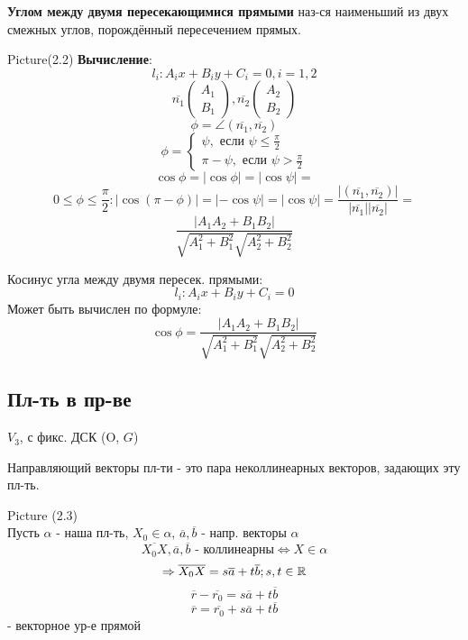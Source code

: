 \begin{definition}
\textbf{Углом между двумя пересекающимися прямыми} наз-ся наименьший из двух смежных углов, порождённый пересечением прямых.
\end{definition}
Picture(2.2)
\textbf{Вычисление}:
\[
l_i \colon A_ix + B_i y + C_i = 0, i = 1, 2
\]
\[
\overline{n_1} \begin{pmatrix}A_1 \\ B_1 \end{pmatrix}, \overline{n_2} \begin{pmatrix}A_2 \\ B_2 \end{pmatrix}
\]
\[
\phi = \angle(\overline{n_1}, \overline{n_2})
\]
\begin{equation*}
\phi = \begin{cases}
\psi, \text{ если } \psi \leq \frac{\pi}{2} \\
\pi - \psi, \text{ если } \psi > \frac{\pi}{2}
\end{cases}
\end{equation*}
\[
\cos \phi = \left|\cos\phi\right| = \left|\cos\psi\right| = 
\]
\begin{equation*}
0 \leq \phi \leq \frac{\pi}{2} \colon \left|\cos (\pi - \phi)\right| = \left|-\cos \psi\right| = \left|\cos \psi\right| = \frac{\left|(\overline{n_1}, \overline{n_2})\right|}{\left|\overline{n_1}\right|\left|\overline{n_2}\right|} =
\end{equation*}
\[
  \frac{\left|A_1A_2 + B_1B_2\right|}{\sqrt{A_1^{2} + B_1^{2}}\sqrt{A_2^{2} + B_2^{2}}}
\]

\begin{statement}
Косинус угла между двумя пересек. прямыми:
\[
l_i \colon A_i x + B_i y + C_i = 0
\]
Может быть вычислен по формуле:
\[
\cos\phi = \frac{\left|A_1A_2 + B_1B_2\right|}{\sqrt{A_1^{2} + B_1^{2}}\sqrt{A_2^{2} + B_2^{2}}}
\]
\end{statement}
\subsection{Пл-ть в пр-ве}
$V_3$, с фикс. ДСК (O, $G$)
\begin{definition}
Направляющий векторы пл-ти - это пара неколлинеарных векторов, задающих эту пл-ть.
\end{definition}
Picture (2.3) \\

Пусть $\alpha$ - наша пл-ть, $X_0 \in \alpha$, $\overline{a}, \overline{b}$ - напр. векторы $\alpha$ \\
\[
\overline{X_0X}, \overline{a}, \overline{b} \text{ - коллинеарны} \iff X \in \alpha
\]
\[
\Rightarrow \overline{X_0X} = s \overline{a} + t \overline{b}; s, t \in \mathbb{R}
\]
\[
\overline{r} - \overline{r_0} = s\overline{a} + t \overline{b}
\]
\begin{equation}
\overline{r} = \overline{r_0} + s\overline{a} + t \overline{b}
\label{eq:vector-plane-eq}
\end{equation}
 - векторное ур-е прямой

